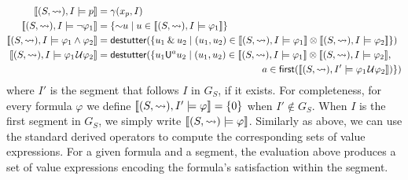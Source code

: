 \scriptsize
\begin{align*}
	\llbracket (S, {\hb}), I \models p \rrbracket &= \gamma(x_p, I) \\
	\llbracket (S, {\hb}), I \models \lnot \varphi_1 \rrbracket &= \{\BitNeg u \st u \in  \llbracket (S, {\hb}), I \models \varphi_1 \rrbracket \} \\
	\llbracket (S, {\hb}), I \models \varphi_1 \land \varphi_2 \rrbracket &= \destutter(\{ u_1 \BitAnd u_2 \st (u_1, u_2) \in \llbracket (S, {\hb}), I \models \varphi_1 \rrbracket \otimes \llbracket (S, {\hb}), I \models \varphi_2 \rrbracket  \}) \\
	\llbracket (S, {\hb}), I \models \varphi_1 \until \varphi_2 \rrbracket &= \destutter(\{ u_1 \mathsf{U}^a u_2 \st (u_1, u_2) \in \llbracket (S, {\hb}), I \models \varphi_1 \rrbracket \otimes \llbracket (S, {\hb}), I \models \varphi_2 \rrbracket, \\
	 &\hspace{17em} a \in \first(\llbracket (S, {\hb}), I' \models \varphi_1 \until \varphi_2 \rrbracket) \})
\end{align*}
\normalsize
where $I'$ is the segment that follows $I$ in $G_S$, if it exists.
For completeness, for every formula $\varphi$ we define $\llbracket (S, {\rightsquigarrow}), I' \models \varphi \rrbracket = \{0\}$ when $I' \notin G_S$.
When $I$ is the first segment in $G_S$, we simply write $\llbracket (S, {\rightsquigarrow}) \models \varphi \rrbracket$.
Similarly as above, we can use the standard derived operators to compute the corresponding sets of value expressions.
For a given formula and a segment, the evaluation above produces a set of value expressions encoding the formula's satisfaction within the segment.

